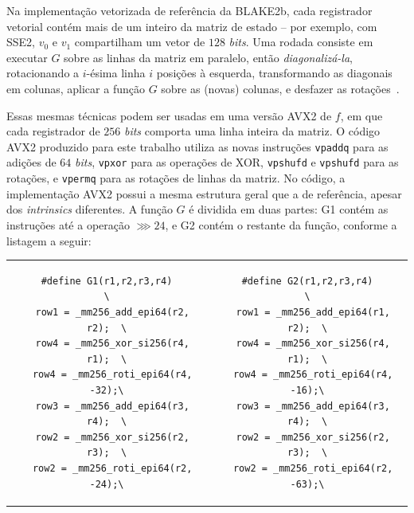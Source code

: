 \documentclass{article}
\begin{document}
Na implementação vetorizada de referência da BLAKE2b, cada registrador vetorial
contém mais de um inteiro da matriz de estado -- por exemplo, com SSE2, $v_{0}$
e $v_{1}$ compartilham um vetor de $128$ \emph{bits}. Uma rodada consiste em
executar $G$ sobre as linhas da matriz em paralelo, então
\emph{diagonalizá-la}, rotacionando a $i$-ésima linha $i$ posições à esquerda,
transformando as diagonais em colunas, aplicar a função $G$ sobre as (novas)
colunas, e desfazer as rotações~\cite{blake2b}.

Essas mesmas técnicas podem ser usadas em uma versão AVX2 de $f$, em que
cada registrador de $256$ \emph{bits} comporta uma linha inteira da matriz. O
código AVX2 produzido para este trabalho utiliza as novas instruções
\texttt{vpaddq} para as adições de $64$ \emph{bits}, \texttt{vpxor} para as
operações de XOR, \texttt{vpshufd} e \texttt{vpshufd} para as rotações, e
\texttt{vpermq} para as rotações de linhas da matriz.
%
No código, a implementação AVX2 possui a mesma estrutura geral que a de
referência, apesar dos \emph{intrinsics} diferentes. A função $G$ é dividida em
duas partes: G1 contém as instruções até a operação $\ggg 24$, e G2 contém o
restante da função, conforme a listagem a seguir:

\hspace{-1.5cm}\begin{tabular}{c|c}
\begin{minipage}{0.5\textwidth}
\begin{small}
\begin{verbatim}
#define G1(r1,r2,r3,r4)             \
  row1 = _mm256_add_epi64(r2, r2);  \
  row4 = _mm256_xor_si256(r4, r1);  \
  row4 = _mm256_roti_epi64(r4, -32);\
  row3 = _mm256_add_epi64(r3, r4);  \
  row2 = _mm256_xor_si256(r2, r3);  \
  row2 = _mm256_roti_epi64(r2, -24);\
\end{verbatim}
\end{small}
\end{minipage} &
\begin{minipage}{0.5\textwidth}
\begin{small}
\begin{verbatim}
#define G2(r1,r2,r3,r4)             \
  row1 = _mm256_add_epi64(r1, r2);  \
  row4 = _mm256_xor_si256(r4, r1);  \
  row4 = _mm256_roti_epi64(r4, -16);\
  row3 = _mm256_add_epi64(r3, r4);  \
  row2 = _mm256_xor_si256(r2, r3);  \
  row2 = _mm256_roti_epi64(r2, -63);\
\end{verbatim}
\end{small}
\end{minipage}
\end{tabular}
\end{document}
